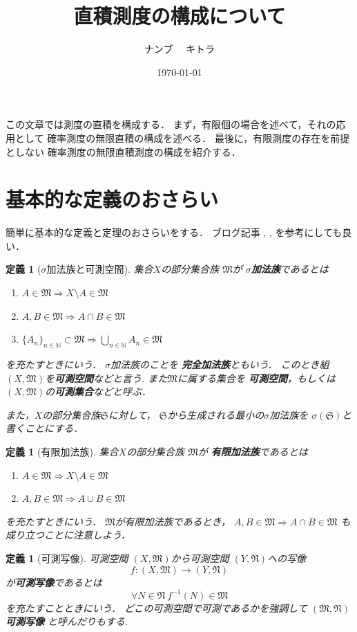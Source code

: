 \documentclass[leqno, a4paper, 12pt]{jsarticle}
\title{直積測度の構成について}
\author{ナンブ　
キトラ}
\date{\today}
\newtheorem{df}[thm]{定義}
\newcommand{\To}{\Longrightarrow}
\newcommand{\nn}{\mathbb{N}}
\begin{document}
\maketitle
この文章では測度の直積を構成する．
まず，有限個の場合を述べて，それの応用として
確率測度の無限直積の構成を述べる．
最後に，有限測度の存在を前提としない
確率測度の無限直積測度の構成を紹介する．
\section{基本的な定義のおさらい}
簡単に基本的な定義と定理のおさらいをする．
ブログ記事
\cite{hatenabsokudo-1}, 
\cite{hatenabsokudo0}, 
\cite{hatenabsokudo1}
を参考にしても良い．
\setcounter{equation}{0}
\begin{df}[$\sigma$加法族と可測空間]
集合$X$の部分集合族
$\mathfrak{M}$が
\textbf{$\sigma$加法族}であるとは
\begin{enumerate}
\item $A\in \mathfrak{M} \To X\setminus A\in \mathfrak{M}$
\item $A,B\in\mathfrak{M} \To A\cap B\in \mathfrak{M}$
\item $\{A_n\}_{n\in \nn}\subset \mathfrak{M} \To \bigcup_{n\in\nn}A_n\in \mathfrak{M}$
\end{enumerate}
を充たすときにいう．
$\sigma$加法族のことを
\textbf{完全加法族}ともいう．
このとき組
$(X,\mathfrak{M})$を\textbf{可測空間}などと言う.
また$\mathfrak{M}$に属する集合を
\textbf{可測空間}，もしくは
$(X, \mathfrak{M})$の\textbf{可測集合}などと呼ぶ．

また，$X$の部分集合族$\mathfrak{S}$に対して，
$\mathfrak{S}$から生成される最小の$\sigma$加法族を
$\sigma(\mathfrak{S})$と書くことにする．

\end{df}

\begin{df}[有限加法族]
集合$X$の部分集合族
$\mathfrak{M}$が
\textbf{有限加法族}であるとは
\begin{enumerate}
\item $A\in \mathfrak{M} \To X\setminus A\in \mathfrak{M}$
\item $A,  B\in  \mathfrak{M} \To A\cup B\in \mathfrak{M}$
\end{enumerate}
を充たすときにいう．
$\mathfrak{M}$が有限加法族であるとき，
$A,B\in\mathfrak{M} \To A\cap B\in \mathfrak{M}$
も成り立つことに注意しよう．
\end{df}



\begin{df}[可測写像]可測空間
$(X,\mathfrak{M})$から可測空間
$(Y,\mathfrak{N})$への写像
\[
f:(X,\mathfrak{M})\to (Y,\mathfrak{N})
\]
が\textbf{可測写像}であるとは
\[
\forall N\in \mathfrak{N}\ f^{-1}(N)\in \mathfrak{M}
\]
を充たすことときにいう．
どこの可測空間で可測であるかを強調して
\textbf{$(\mathfrak{M},\mathfrak{N})$可測写像}
と呼んだりもする.
\end{df}
\end{document}

